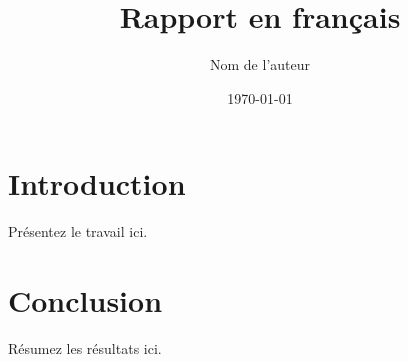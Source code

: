 \documentclass[12pt]{report}
\title{Rapport en français}
\author{Nom de l'auteur}
\date{\today}
\begin{document}
\maketitle
\tableofcontents

\chapter{Introduction}
Présentez le travail ici.

\chapter{Conclusion}
Résumez les résultats ici.

% 
\end{document}
